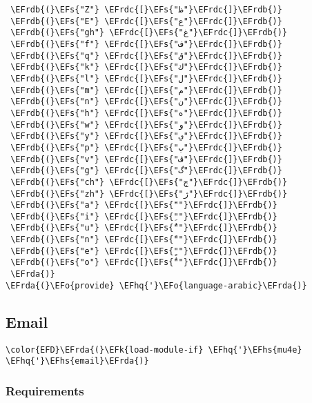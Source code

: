 \documentclass[a4wide,10pt]{article}
\newcommand{\EFs}[1]{\textcolor{EFs}{#1}} %
\newcommand{\EFk}[1]{\textcolor{EFk}{#1}} %
\newcommand{\EFo}[1]{\textcolor{EFo}{#1}} %
\newcommand{\EFhq}[1]{\textcolor{EFhq}{#1}} %
\newcommand{\EFhs}[1]{\textcolor{EFhs}{#1}} %
\newcommand{\EFrda}[1]{\textcolor{EFrda}{#1}} %
\newcommand{\EFrdb}[1]{\textcolor{EFrdb}{#1}} %
\newcommand{\EFrdc}[1]{\textcolor{EFrdc}{#1}} %
\begin{document}
\begin{Code}
\begin{Verbatim}
 \EFrdb{(}\EFs{"Z"} \EFrdc{[}\EFs{"ظ"}\EFrdc{]}\EFrdb{)}
 \EFrdb{(}\EFs{"E"} \EFrdc{[}\EFs{"ع"}\EFrdc{]}\EFrdb{)}
 \EFrdb{(}\EFs{"gh"} \EFrdc{[}\EFs{"غ"}\EFrdc{]}\EFrdb{)}
 \EFrdb{(}\EFs{"f"} \EFrdc{[}\EFs{"ف"}\EFrdc{]}\EFrdb{)}
 \EFrdb{(}\EFs{"q"} \EFrdc{[}\EFs{"ق"}\EFrdc{]}\EFrdb{)}
 \EFrdb{(}\EFs{"k"} \EFrdc{[}\EFs{"ك"}\EFrdc{]}\EFrdb{)}
 \EFrdb{(}\EFs{"l"} \EFrdc{[}\EFs{"ل"}\EFrdc{]}\EFrdb{)}
 \EFrdb{(}\EFs{"m"} \EFrdc{[}\EFs{"م"}\EFrdc{]}\EFrdb{)}
 \EFrdb{(}\EFs{"n"} \EFrdc{[}\EFs{"ن"}\EFrdc{]}\EFrdb{)}
 \EFrdb{(}\EFs{"h"} \EFrdc{[}\EFs{"ه"}\EFrdc{]}\EFrdb{)}
 \EFrdb{(}\EFs{"w"} \EFrdc{[}\EFs{"و"}\EFrdc{]}\EFrdb{)}
 \EFrdb{(}\EFs{"y"} \EFrdc{[}\EFs{"ي"}\EFrdc{]}\EFrdb{)}
 \EFrdb{(}\EFs{"p"} \EFrdc{[}\EFs{"پ"}\EFrdc{]}\EFrdb{)}
 \EFrdb{(}\EFs{"v"} \EFrdc{[}\EFs{"ڤ"}\EFrdc{]}\EFrdb{)}
 \EFrdb{(}\EFs{"g"} \EFrdc{[}\EFs{"گ"}\EFrdc{]}\EFrdb{)}
 \EFrdb{(}\EFs{"ch"} \EFrdc{[}\EFs{"چ"}\EFrdc{]}\EFrdb{)}
 \EFrdb{(}\EFs{"zh"} \EFrdc{[}\EFs{"ژ"}\EFrdc{]}\EFrdb{)}
 \EFrdb{(}\EFs{"a"} \EFrdc{[}\EFs{"َ"}\EFrdc{]}\EFrdb{)}
 \EFrdb{(}\EFs{"i"} \EFrdc{[}\EFs{"ِ"}\EFrdc{]}\EFrdb{)}
 \EFrdb{(}\EFs{"u"} \EFrdc{[}\EFs{"ُ"}\EFrdc{]}\EFrdb{)}
 \EFrdb{(}\EFs{"n"} \EFrdc{[}\EFs{"ً"}\EFrdc{]}\EFrdb{)}
 \EFrdb{(}\EFs{"e"} \EFrdc{[}\EFs{"ٍ"}\EFrdc{]}\EFrdb{)}
 \EFrdb{(}\EFs{"o"} \EFrdc{[}\EFs{"ٌ"}\EFrdc{]}\EFrdb{)}
 \EFrda{)}
\EFrda{(}\EFo{provide} \EFhq{'}\EFo{language-arabic}\EFrda{)}
\end{Verbatim}
\end{Code}
\subsection{Email}
\label{sec:org1999f15}
\begin{Code}
\begin{Verbatim}
\color{EFD}\EFrda{(}\EFk{load-module-if} \EFhq{'}\EFhs{mu4e} \EFhq{'}\EFhs{email}\EFrda{)}
\end{Verbatim}
\end{Code}
\subsubsection{Requirements}
\label{sec:org0249fb9}
\end{document}
